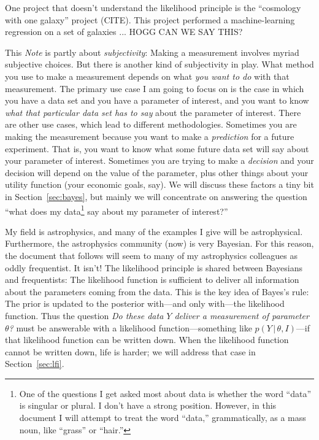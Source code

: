 \documentclass{article}
\newcommand{\documentname}{\textsl{Note}}
\newcommand{\sectionname}{Section}
\newcommand{\secref}[1]{\sectionname~\ref{#1}}
\newcommand{\given}{\,|\,}
\begin{document}
One project that doesn't understand the likelihood principle is the ``cosmology with one galaxy'' project (CITE).
This project performed a machine-learning regression on a set of galaxies ... HOGG CAN WE SAY THIS?

This \documentname{} is partly about \emph{subjectivity}:
Making a measurement involves myriad subjective choices.
But there is another kind of subjectivity in play.
What method you use to make a measurement depends on what \emph{you want to do} with that measurement.
The primary use case I am going to focus on is the case in which you have a data set and you have a parameter of interest, and you want to know \emph{what that particular data set has to say} about the parameter of interest.
There are other use cases, which lead to different methodologies.
Sometimes you are making the measurement because you want to make a \emph{prediction} for a future experiment.
That is, you want to know what some future data set will say about your parameter of interest.
Sometimes you are trying to make a \emph{decision} and your decision will depend on the value of the parameter, plus other things about your utility function (your economic goals, say).
We will discuss these factors a tiny bit in \secref{sec:bayes}, but mainly we will concentrate on answering the question ``what does my data\footnote{%
One of the questions I get asked most about data is whether the word ``data'' is singular or plural. I don't have a strong position. However, in this document I will attempt to treat the word ``data,'' grammatically, as a mass noun, like ``grass'' or ``hair.''}
say about my parameter of interest?''

My field is astrophysics, and many of the examples I give will be astrophysical.
Furthermore, the astrophysics community (now) is very Bayesian.
For this reason, the document that follows will seem to many of my astrophysics colleagues as oddly frequentist.
It isn't!
The likelihood principle is shared between Bayesians and frequentists:
The likelihood function is sufficient to deliver all information about the parameters coming from the data.
This is the key idea of Bayes's rule:
The prior is updated to the posterior with---and only with---the likelihood function.
Thus the question \emph{Do these data $Y$ deliver a measurement of parameter $\theta$?} must be answerable with a likelihood function---something like $p(Y\given\theta,I)$---if that likelihood function can be written down.
When the likelihood function cannot be written down, life is harder; we will address that case in \secref{sec:lfi}.
\end{document}
